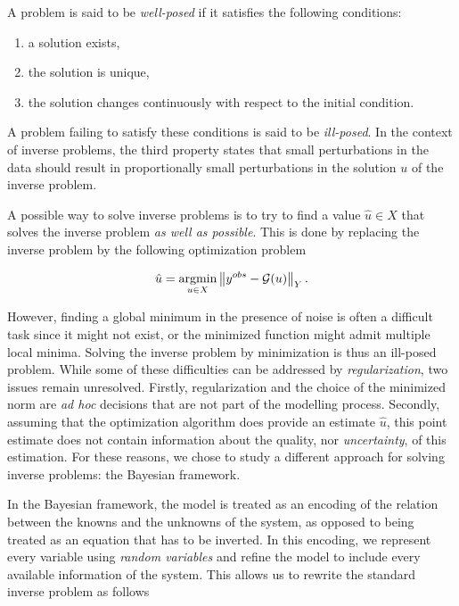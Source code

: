 \begin{definition} A problem is said to be \textit{well-posed} if it satisfies the following conditions:
  \begin{enumerate}
  \item{a solution exists,}
  \item{the solution is unique,}
  \item{the solution changes continuously with respect to the initial condition.}
  \end{enumerate}

  A problem failing to satisfy these conditions is said to be \textit{ill-posed}. In the context of inverse problems, the third property states that small perturbations in the data should result in proportionally small perturbations in the solution $u$ of the inverse problem.  
\end{definition}

A possible way to solve inverse problems is to try to find a value $\hat u \in X$ that solves the inverse problem \textit{as well as possible}. This is done by replacing the inverse problem by the following optimization problem

\begin{equation*}
  \hat u = \underset{u \in X}{\text{argmin}} \left\lVert y^{obs} - \mathcal{G}(u) \right\rVert_Y.
\end{equation*}

However, finding a global minimum in the presence of noise is often a difficult task since it might not exist, or the minimized function might admit multiple local minima. Solving the inverse problem by minimization is thus an ill-posed problem. While some of these difficulties can be addressed by \textit{regularization}, two issues remain unresolved. Firstly, regularization and the choice of the minimized norm are \textit{ad hoc} decisions that are not part of the modelling process. Secondly, assuming that the optimization algorithm does provide an estimate $\hat u$, this point estimate does not contain information about the quality, nor \textit{uncertainty}, of this estimation. For these reasons, we chose to study a different approach for solving inverse problems: the Bayesian framework.

In the Bayesian framework, the model is treated as an encoding of the relation between the knowns and the unknowns of the system, as opposed to being treated as an equation that has to be inverted. In this encoding, we represent every variable using \textit{random variables} and refine the model to include every available information of the system. This allows us to rewrite the standard inverse problem as follows


